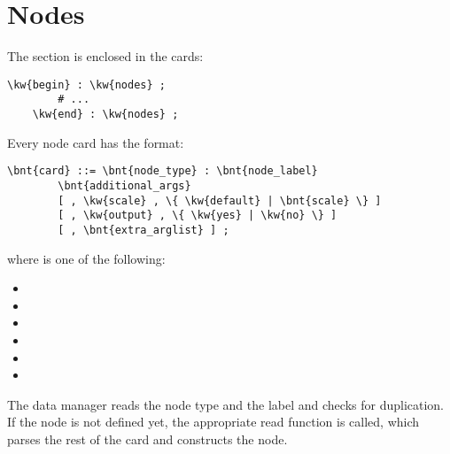 %
%
%
%
%
% 
%
%

\chapter{Nodes}\label{sec:NODES}
The  section is enclosed in the cards:
\begin{Verbatim}[commandchars=\\\{\}]
    \kw{begin} : \kw{nodes} ;
        # ...
    \kw{end} : \kw{nodes} ;
\end{Verbatim}
Every node card has the format:
\begin{Verbatim}[commandchars=\\\{\}]
    \bnt{card} ::= \bnt{node_type} : \bnt{node_label}
        \bnt{additional_args}
        [ , \kw{scale} , \{ \kw{default} | \bnt{scale} \} ]
        [ , \kw{output} , \{ \kw{yes} | \kw{no} \} ]
        [ , \bnt{extra_arglist} ] ;
\end{Verbatim}
where  is one of the following:
\begin{itemize}
    \item {}
    \item {}
    \item {}
    \item {}
    \item {}
    \item {}
\end{itemize}
The data manager reads the node type and the label and checks for
duplication.
If the node is not defined yet, the appropriate read function is
called, which parses the rest of the card and constructs the node.

